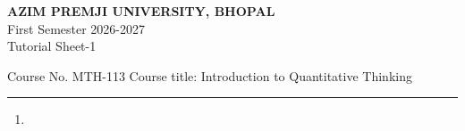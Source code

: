 \documentclass[a4paper,leqno,12pt]{amsart}
\begin{document}
\begin{center}
{{\textbf{ AZIM PREMJI UNIVERSITY, BHOPAL}\\
First Semester  2026-2027\\
Tutorial Sheet-1 }}
\end{center}

\noindent Course No. MTH-113 \hfill  Course title: Introduction to Quantitative Thinking
\vspace{.3cm}
\hrule 
\vspace{.3cm}


\begin{enumerate}
\setlength\itemsep{1em}
\item 




\end{enumerate}


\end{document}
